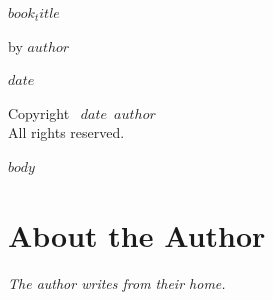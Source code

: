 \documentclass[14pt]{memoir}
\def\booktitle{$book_title$}
\def\bookauthor{$author$}
\def\bookdate{$date$}
\begin{document}
\thispagestyle{empty}
\begin{center}
\vspace*{1in}
{\Huge\bfseries\booktitle\par}
\vspace{2in}
{\Large by \bookauthor\par}
\vfill
{\large\bookdate}
\end{center}

\clearpage
\thispagestyle{empty}
\vspace*{\fill}
\begin{center}
Copyright \textcopyright\ \bookdate\ \bookauthor\\
All rights reserved.
\end{center}
\vspace*{\fill}

\mainmatter

$body$

\clearpage
\section*{About the Author}

\bigskip
\textit{The author writes from their home.}\\
\end{document}
